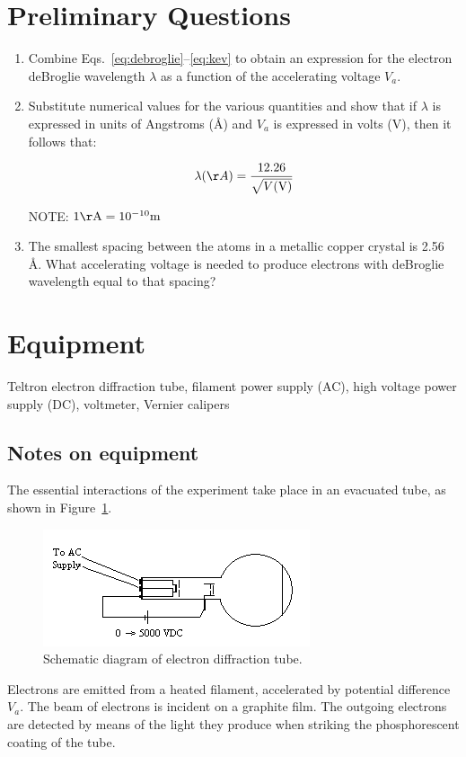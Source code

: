 \documentclass{article}
\begin{document}
\section{Preliminary Questions}
\begin{enumerate}
\item Combine Eqs.~\ref{eq:debroglie}--\ref{eq:kev} to obtain an expression for the electron deBroglie
wavelength ${\lambda}$ as a 
function of the accelerating voltage $V_a$.

\item Substitute numerical values for the various quantities and show
that if $\lambda$ is expressed in units of Angstroms (\AA) and $V_a$ is
expressed in volts (V), then it follows that:

\begin{equation}
\lambda(\AA) = {12.26 \over \sqrt{V({\rm V})} }
\end{equation}

NOTE: $1 {\rm \AA} = 10^{-10} {\rm m}$

\item The smallest spacing between the atoms in a metallic copper crystal
is 2.56  \AA. What accelerating voltage is needed
to produce electrons with deBroglie wavelength equal to that spacing?
\end{enumerate}

\section{Equipment}
Teltron electron diffraction tube, filament power supply (AC), high voltage power supply (DC), voltmeter, Vernier calipers

\subsection{Notes on equipment}

The essential interactions of the experiment take place in an evacuated
tube, as shown in Figure~\ref{fig:schematic}. 
\begin{figure}
\begin{centering}
\includegraphics[width=3.0929in,height=1.3543in]{images/ediffraction-img1.png}
\caption{Schematic diagram of electron diffraction tube.}
\label{fig:schematic}
\end{centering}
\end{figure}
Electrons are emitted from a heated filament,
accelerated by potential difference $V_a$.  The beam of
electrons is incident on a graphite film.  The outgoing electrons are
detected by means of the light they produce when striking the
phosphorescent coating of the tube. 
\end{document}
